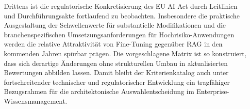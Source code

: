Drittens ist die regulatorische Konkretisierung des EU AI Act durch Leitlinien und Durchführungsakte fortlaufend zu beobachten. Insbesondere die praktische Ausgestaltung der Schwellenwerte für substantielle Modifikationen \autocite[Rn.~61]{EuropeanCommission.2025} und die branchenspezifischen Umsetzungsanforderungen für Hochrisiko-Anwendungen werden die relative Attraktivität von Fine-Tuning gegenüber RAG in den kommenden Jahren spürbar prägen. Die vorgeschlagene Matrix ist so konstruiert, dass sich derartige Änderungen ohne strukturellen Umbau in aktualisierten Bewertungen abbilden lassen. Damit bleibt der Kriterienkatalog auch unter fortschreitender technischer und regulatorischer Entwicklung ein tragfähiger Bezugsrahmen für die architektonische Auswahlentscheidung im Enterprise-Wissensmanagement.
